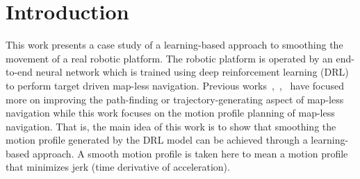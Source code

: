 
\chapter{Introduction}
\vspace{2em}

This work presents a case study of a learning-based approach to smoothing the movement of a real robotic platform. The robotic platform is operated by an end-to-end neural network which is trained using deep reinforcement learning (DRL) to perform target driven map-less navigation. Previous works~\cite{pfeiffer_reinforced_2018},~\cite{tai_virtual--real_2017},~\cite{xie_learning_2018} have focused more on improving the path-finding or trajectory-generating aspect of map-less navigation while this work focuses on the motion profile planning of map-less navigation. That is, the main idea of this work is to show that smoothing the motion profile generated by the DRL model can be achieved through a learning-based approach. A smooth motion profile is taken here to mean a motion profile that minimizes jerk (time derivative of acceleration).